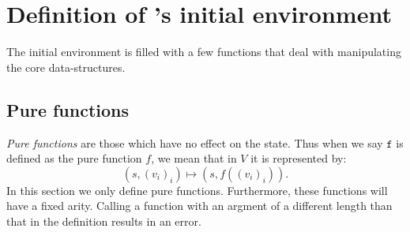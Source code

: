 \section{Definition of \rad's initial environment}
\label{initial-env}

The initial environment is filled with a few functions that deal with
manipulating the core data-structures.

\subsection{Pure functions}

\emph{Pure functions} are those which have no effect on the state. Thus when we
say $\mathtt{f}$ is defined as the pure function $f$, we mean that in $V$ it is
represented by:
\[
  (s, (v_i)_i) \mapsto (s, f((v_i)_i)).
\]
In this section we only define pure functions. Furthermore, these functions will
have a fixed arity. Calling a function with an argment of a different length
than that in the definition results in an error.

